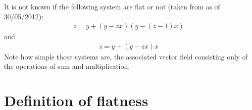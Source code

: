 \documentclass[12pt]{article}
\begin{document}
\begin{example}
  It is not known if the following system are flat or not (taken from \cite{AP05} as
  of 30/05/2012):
  \begin{align*}
      \dot{z} = y + (\dot{y} - z \dot{x})( \dot{y} - (z-1)\dot{x} )
  \end{align*}
  and
  \begin{align*}
      \dot{z} = y + (\dot{y} - z \dot{x}) \dot{x}
  \end{align*}
  Note how simple those systems are, the associated vector field consisting only of the
  operations of sum and multiplication.
\end{example}

\section{Definition of flatness}
\end{document}
